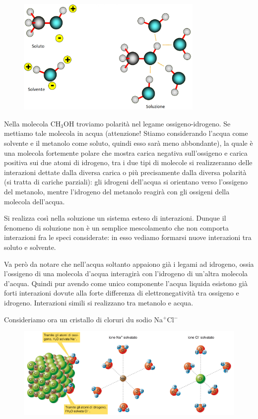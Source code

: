 \begin{figure}[htp]
    \centering
    \includegraphics[width=9cm]{immagini/acido_acetico.png}
\end{figure}

Nella molecola CH$_3$OH troviamo polarità nel legame ossigeno-idrogeno. Se mettiamo tale molecola in acqua (attenzione! Stiamo considerando l'acqua come solvente e il metanolo come soluto, quindi esso sarà meno abbondante), la quale è una molecola fortemente polare che mostra carica negativa sull'ossigeno e carica positiva sui due atomi di idrogeno, tra i due tipi di molecole si realizzeranno delle interazioni dettate dalla diversa carica o più precisamente dalla diversa polarità (si tratta di cariche parziali): gli idrogeni dell'acqua si orientano verso l'ossigeno del metanolo, mentre l'idrogeno del metanolo reagirà con gli ossigeni della molecola dell'acqua.

Si realizza così nella soluzione un sistema esteso di interazioni. Dunque il fenomeno di soluzione non è un semplice mescolamento che non comporta interazioni fra le speci considerate: in esso vediamo formarsi nuove interazioni tra soluto e solvente.

Va però da notare che nell'acqua soltanto appaiono già i legami ad idrogeno, ossia l'ossigeno di una molecola d'acqua interagirà con l'idrogeno di un'altra molecola d'acqua. Quindi pur avendo come unico componente l'acqua liquida esistono già forti interazioni dovute alla forte differenza di elettronegatività tra ossigeno e idrogeno. Interazioni simili si realizzano tra metanolo e acqua.

\vspace{0.2cm} Consideriamo ora un cristallo di cloruri du sodio Na$^+$Cl$^-$

\begin{figure}[htp]
    \centering
    \includegraphics[width=12cm]{immagini/solvatazione_cloruro_di_sodio.png}
\end{figure}

